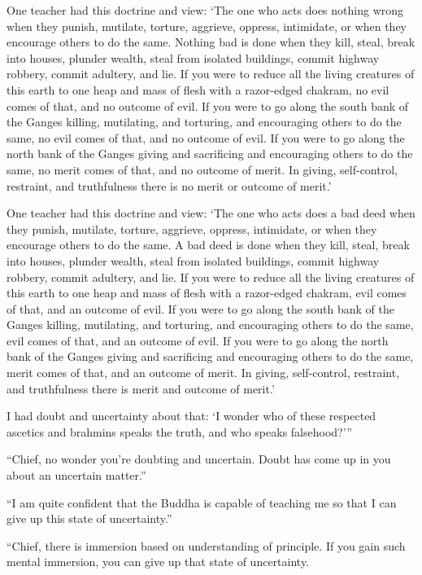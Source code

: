 \documentclass[12pt,openany]{book}%
\begin{document}
One teacher had this doctrine and view: ‘The one who acts does nothing wrong when they punish, mutilate, torture, aggrieve, oppress, intimidate, or when they encourage others to do the same. Nothing bad is done when they kill, steal, break into houses, plunder wealth, steal from isolated buildings, commit highway robbery, commit adultery, and lie. If you were to reduce all the living creatures of this earth to one heap and mass of flesh with a razor-edged chakram, no evil comes of that, and no outcome of evil. If you were to go along the south bank of the Ganges killing, mutilating, and torturing, and encouraging others to do the same, no evil comes of that, and no outcome of evil. If you were to go along the north bank of the Ganges giving and sacrificing and encouraging others to do the same, no merit comes of that, and no outcome of merit. In giving, self-control, restraint, and truthfulness there is no merit or outcome of merit.’ 

One teacher had this doctrine and view: ‘The one who acts does a bad deed when they punish, mutilate, torture, aggrieve, oppress, intimidate, or when they encourage others to do the same. A bad deed is done when they kill, steal, break into houses, plunder wealth, steal from isolated buildings, commit highway robbery, commit adultery, and lie. If you were to reduce all the living creatures of this earth to one heap and mass of flesh with a razor-edged chakram, evil comes of that, and an outcome of evil. If you were to go along the south bank of the Ganges killing, mutilating, and torturing, and encouraging others to do the same, evil comes of that, and an outcome of evil. If you were to go along the north bank of the Ganges giving and sacrificing and encouraging others to do the same, merit comes of that, and an outcome of merit. In giving, self-control, restraint, and truthfulness there is merit and outcome of merit.’ 

I had doubt and uncertainty about that: ‘I wonder who of these respected ascetics and brahmins speaks the truth, and who speaks falsehood?’” 

“Chief, no wonder you’re doubting and uncertain. Doubt has come up in you about an uncertain matter.” 

“I am quite confident that the Buddha is capable of teaching me so that I can give up this state of uncertainty.” 

“Chief, there is immersion based on understanding of principle. If you gain such mental immersion, you can give up that state of uncertainty. 
\end{document}
